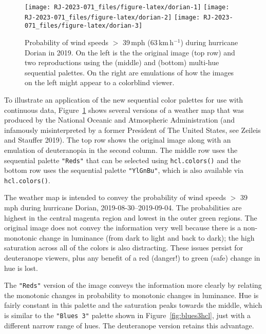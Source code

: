 \begin{figure}[t!]

{\centering \texttt{[image: RJ-2023-071\_files/figure-latex/dorian-1]} \texttt{[image: RJ-2023-071\_files/figure-latex/dorian-2]} \texttt{[image: RJ-2023-071\_files/figure-latex/dorian-3]} 

}

\caption{Probability of wind speeds $>$ 39\,mph (63\,km\,h$^{-1}$) during hurricane Dorian in 2019. On the left is the the original image (top row) and two reproductions using the  (middle) and  (bottom) multi-hue sequential palettes. On the right are emulations of how the images on the left might appear to a colorblind viewer.}\label{fig:dorian}
\end{figure}

To illustrate an application of the new sequential color palettes
for use with continuous data,
Figure~\ref{fig:dorian} shows several versions of a weather
map that was produced by the National Oceanic and Atmospheric Administration
(and infamously misinterpreted by a former President of The United States, see Zeileis and Stauffer 2019).
The top row shows the original image along with an emulation of
deuteranopia in the second column.
The middle row uses the sequential palette
\texttt{"Reds"} that can be selected using \texttt{hcl.colors()} and the
bottom row uses the sequential palette \texttt{"YlGnBu"}, which is also
available via \texttt{hcl.colors()}.

The weather map is intended to convey
the probability of wind speeds \(>\) 39 mph
during hurricane Dorian, 2019-08-30--2019-09-04. The probabilities are highest
in the central magenta region and lowest in the outer green regions.
The original image does not convey the information very well because
there is a non-monotonic change in luminance
(from dark to light and back to dark); the high saturation across
all of the colors is also distracting. These issues persist for
deuteranope viewers, plus any benefit of a red (danger!) to green (safe)
change in hue is lost.

The \texttt{"Reds"} version of the image conveys the information more clearly
by relating the monotonic changes in probability to monotonic
changes in luminance. Hue is fairly constant in this palette and
the saturation peaks towards the middle, which is similar to the
\texttt{"Blues\ 3"} palette shown in
Figure~\ref{fig:blues3hcl}, just with a different narrow range of hues.
The deuteranope version retains this advantage.

